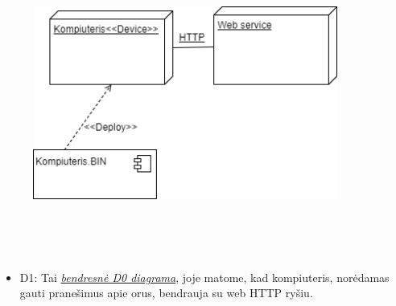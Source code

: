 \documentclass[oneside]{VUMIFPSkursinis}
\begin{document}
		\begin{figure}[H]
		\centering	
	\includegraphics[width=10cm,height=10cm,keepaspectratio]{Deployment0.png}
	\caption{                                                            }
	\label{fig:Deployment0}
\end{figure}
	\begin{itemize}
		\item D1: Tai \hyperref[fig:Deployment0]{\textit{bendresnė D0 diagrama}}, joje matome, kad kompiuteris, norėdamas gauti pranešimus apie orus,  bendrauja su web HTTP ryšiu.
	\end{itemize}
\end{document}
